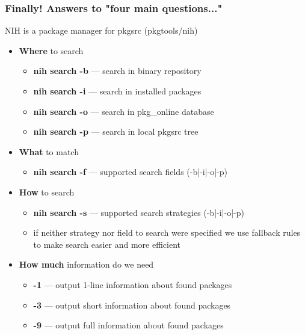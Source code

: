 \documentclass[hyperref=unicode,ascii,xcolor=dvipsnames]{beamer}
\begin{document}

\begin{frame}[fragile]
  \frametitle{Finally! Answers to "four main questions..."}
NIH is a package manager for pkgsrc (pkgtools/nih)
\begin{itemize}
\item {\bf Where} to search
  \begin{itemize}
  \item {\bf nih search -b} --- search in binary repository
  \item {\bf nih search -i} --- search in installed packages
  \item {\bf nih search -o} --- search in pkg\_online database
  \item {\bf nih search -p} --- search in local pkgsrc tree
  \end{itemize}
\item {\bf What} to match
  \begin{itemize}
  \item {\bf nih search -f} --- supported search fields (-b|-i|-o|-p)
  \end{itemize}
\item {\bf How} to search
  \begin{itemize}
  \item {\bf nih search -s} --- supported search strategies (-b|-i|-o|-p)
  \item if neither strategy nor field to search were specified we use
    fallback rules to make search easier and more efficient
  \end{itemize}
\item {\bf How much} information do we need
  \begin{itemize}
  \item {\bf -1} --- output 1-line information about found packages
  \item {\bf -3} --- output short information about found packages
  \item {\bf -9} --- output full information about found packages
  \end{itemize}
\end{itemize}
\end{frame}

\end{document}

